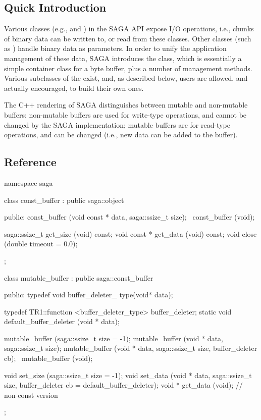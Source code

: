 
\subsection{Quick Introduction}

 Various classes (e.g.,   and ) in the SAGA
 API expose I/O operations, i.e., chunks of binary data can be written
 to, or read from these classes.  Other classes (such as )
 handle binary data as parameters.  In order to unify the application
 management of these data, SAGA introduces the  class,
 which is essentially a simple container class for a byte buffer, plus
 a number of management methods.  Various subclasses of the
  exist, and, as described below, users are allowed, and
 actually encouraged, to build their own ones.

 The C++ rendering of SAGA distinguishes between mutable and
 non-mutable buffers: non-mutable buffers are used for write-type 
 operations, and cannot be changed by the SAGA implementation; mutable
 buffers are for read-type operations, and can be changed (i.e., new
 data can be added to the buffer).


\subsection{Reference}

 \begin{mycode}[label=Prototype: saga::buffer]
  namespace saga 
  {
    class const_buffer
        : public saga::object
    {
      public:
        const_buffer  (void const  * data, 
                       saga::ssize_t size);
        ~const_buffer (void);

        saga::ssize_t  get_size (void) const;
        void const *   get_data (void) const;
        void           close    (double timeout = 0.0);
    };

    class mutable_buffer
        : public saga::const_buffer
    {
      public:
        typedef void buffer_deleter_ type(void* data);

        typedef TR1::function <buffer_deleter_type> buffer_deleter;
        static void default_buffer_deleter (void * data);

        mutable_buffer  (saga::ssize_t  size = -1);
        mutable_buffer  (void * data, 
                         saga::ssize_t  size);
        mutable_buffer  (void * data, 
                         saga::ssize_t  size, 
                         buffer_deleter cb);
        ~mutable_buffer (void);

        void   set_size   (saga::ssize_t  size = -1);
        void   set_data   (void * data, 
                           saga::ssize_t  size,
                           buffer_deleter cb = default_buffer_deleter);
        void * get_data   (void);  // non-const version
    };
  }
\end{mycode}


